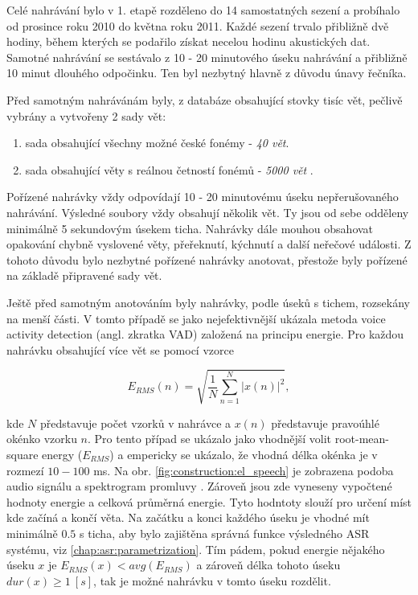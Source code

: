 Celé nahrávání bylo v 1. etapě rozděleno do 14 samostatných sezení a probíhalo od prosince roku 2010 do května roku 2011. Každé sezení trvalo přibližně dvě hodiny, během kterých se podařilo získat necelou hodinu akustických dat. Samotné nahrávání se sestávalo z 10 - 20 minutového úseku nahrávání a přibližně 10 minut dlouhého odpočinku. Ten byl nezbytný hlavně z důvodu únavy řečníka.

Před samotným nahrávánám byly, z databáze obsahující stovky tisíc vět, pečlivě vybrány a vytvořeny 2 sady vět:

\begin{enumerate}
  \item sada obsahující všechny možné české fonémy - \textit{40 vět}.
  \item sada obsahující věty s reálnou četností fonémů - \textit{5000 vět} \cite{Radova2000}.
\end{enumerate}

\noindent Pořízené nahrávky vždy odpovídají 10 - 20 minutovému úseku nepřerušovaného nahrávání. Výsledné soubory vždy obsahují několik vět. Ty jsou od sebe odděleny minimálně 5 sekundovým úsekem ticha. Nahrávky dále mouhou obsahovat opakování chybně vyslovené věty, přeřeknutí, kýchnutí a další neřečové události. Z tohoto důvodu bylo nezbytné pořízené nahrávky anotovat, přestože byly pořízené na základě připravené sady vět.

Ještě před samotným anotováním byly nahrávky, podle úseků s tichem, rozsekány na menší části. V tomto případě se jako nejefektivnější ukázala metoda voice activity detection (angl. zkratka VAD) založená na principu energie. Pro každou nahrávku obsahující více vět se pomocí vzorce

\begin{equation}
  \label{eq:construction:energy}
  E_{RMS}(n) = \sqrt{\frac{1}{N} \sum_{n=1}^{N} \left| x(n) \right|^2},
\end{equation}

\noindent kde $N$ představuje počet vzorků v nahrávce a $x(n)$ představuje pravoúhlé okénko vzorku $n$. Pro tento případ se ukázalo jako vhodnější volit root-mean-square energy ($E_{RMS}$) a empericky se ukázalo, že vhodná délka okénka je v rozmezí $10 - 100$ ms. Na obr. \ref{fig:construction:el_speech} je zobrazena podoba audio signálu a spektrogram promluvy \textit{}. Zároveň jsou zde vyneseny vypočtené hodnoty energie a celková průměrná energie. Tyto hodntoty slouží pro určení míst kde začíná a končí věta. Na začátku a konci každého úseku je vhodné mít minimálně $0.5$ s ticha, aby bylo zajištěna správná funkce výsledného ASR systému, viz \ref{chap:asr:parametrization}. Tím pádem, pokud energie nějakého úseku $x$ je $E_{RMS}(x) < avg(E_{RMS})$ a zároveň délka tohoto úseku $dur(x) \geq 1\ [s]$, tak je možné nahrávku v tomto úseku rozdělit.

